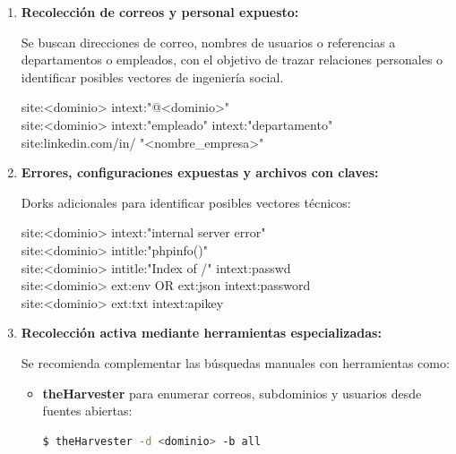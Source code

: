 \documentclass[a4paper, 11pt]{article}
\begin{document}
\begin{enumerate}
    \item \textbf{Recolección de correos y personal expuesto:}

    Se buscan direcciones de correo, nombres de usuarios o referencias a departamentos o empleados, con el objetivo de trazar relaciones personales o identificar posibles vectores de ingeniería social.

    \begin{tcolorbox}[colback=yellow!20!white, colframe=orange!80!black, title={Dorks para emails y personal}]
    \small
    site:<dominio> intext:"@<dominio>" \\
    site:<dominio> intext:"empleado" \textbar{} intext:"departamento" \\
    site:linkedin.com/in/ "\textless nombre\_empresa\textgreater"
    \end{tcolorbox}

    \item \textbf{Errores, configuraciones expuestas y archivos con claves:}

    Dorks adicionales para identificar posibles vectores técnicos:

     \begin{tcolorbox}[colback=yellow!20!white, colframe=orange!80!black, title={Dorks para claves, errores y archivos críticos}]
    \small
    site:<dominio> intext:"internal server error" \\
    site:<dominio> intitle:"phpinfo()" \\
    site:<dominio> intitle:"Index of /" intext:passwd \\
    site:<dominio> ext:env OR ext:json intext:password \\
    site:<dominio> ext:txt intext:apikey
    \end{tcolorbox}

    \item \textbf{Recolección activa mediante herramientas especializadas:}

    Se recomienda complementar las búsquedas manuales con herramientas como:

    \begin{itemize}
        \item \textbf{theHarvester} para enumerar correos, subdominios y usuarios desde fuentes abiertas:
        \begin{lstlisting}[language=bash, style=terminalstyle, caption=Enumeración con theHarvester]
$ theHarvester -d <dominio> -b all
        \end{lstlisting}


\end{itemize}
\end{enumerate}
\end{document}
